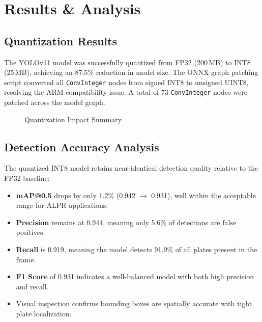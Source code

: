 \chapter{Results \& Analysis}

\section{Quantization Results}
The YOLOv11 model was successfully quantized from FP32 (200\,MB) to INT8 (25\,MB), achieving an 87.5\% reduction in model size. The ONNX graph patching script converted all \texttt{ConvInteger} nodes from signed INT8 to unsigned UINT8, resolving the ARM compatibility issue. A total of 73 \texttt{ConvInteger} nodes were patched across the model graph.

\begin{figure}[H]
\centering
{}
\caption{Quantization Impact Summary}
\label{fig:quant_summary}
\end{figure}

\section{Detection Accuracy Analysis}
The quantized INT8 model retains near-identical detection quality relative to the FP32 baseline:
\begin{itemize}
    \item \textbf{mAP@0.5} drops by only 1.2\% (0.942 $\to$ 0.931), well within the acceptable range for ALPR applications.
    \item \textbf{Precision} remains at 0.944, meaning only 5.6\% of detections are false positives.
    \item \textbf{Recall} is 0.919, meaning the model detects 91.9\% of all plates present in the frame.
    \item \textbf{F1 Score} of 0.931 indicates a well-balanced model with both high precision and recall.
    \item Visual inspection confirms bounding boxes are spatially accurate with tight plate localization.
\end{itemize}

